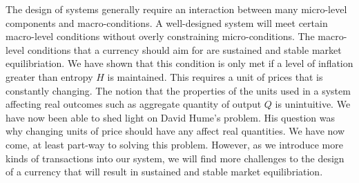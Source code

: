 The design of systems generally require an interaction between many micro-level components and
macro-conditions. A well-designed system will meet certain macro-level conditions without overly
constraining micro-conditions. The macro-level conditions that a currency should aim for are
sustained and stable market equilibriation. We have shown that this condition is only met if a
level of inflation greater than entropy $H$ is maintained. This requires a unit of prices that is
constantly changing. The notion that the properties of the units used in a system affecting real
outcomes such as aggregate quantity of output $Q$ is unintuitive. We have now been able to shed
light on David Hume's problem. His question was why changing units of price should have any affect
real quantities. We have now come, at least part-way to solving this problem. However, as we
introduce more kinds of transactions into our system, we will find more challenges to the design of
a currency that will result in sustained and stable market equilibriation.  


